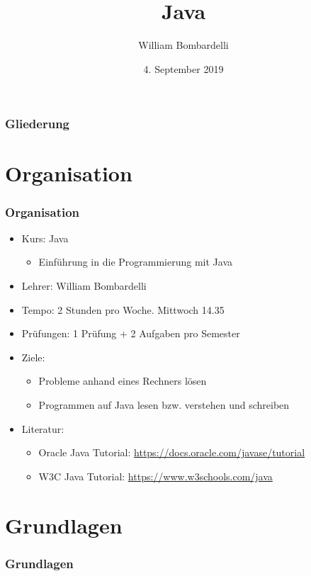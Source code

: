 \documentclass{beamer}
\title[Java]{Java}
\author[W. Bombardelli]{William Bombardelli}
\institute[Schweizerschule Mexiko]
{
	\vskip 12pt
	Schweizerschule Mexiko, Ciudad de México, Mexiko \\
	\texttt{E-Mail...}
}
\date{4. September 2019}
\begin{document}
	\begin{frame}
		\titlepage
	\end{frame}
	
	\begin{frame}
		\frametitle{Gliederung}
		\tableofcontents
	\end{frame}
	
	\section{Organisation}
	\begin{frame}
		\frametitle{Organisation}
		
		\begin{itemize}
			\item Kurs: Java
			\begin{itemize}
				\item Einführung in die Programmierung mit Java
			\end{itemize}
			\item Lehrer: William Bombardelli
			\item Tempo: 2 Stunden pro Woche. Mittwoch 14.35
			\item Prüfungen: 1 Prüfung + 2 Aufgaben pro Semester
			\item Ziele:
			\begin{itemize}
				\item Probleme anhand eines Rechners lösen
				\item Programmen auf Java lesen bzw. verstehen und schreiben 
			\end{itemize}
			\item Literatur: 
			\begin{itemize}
				\item Oracle Java Tutorial: \url{https://docs.oracle.com/javase/tutorial}
				\item W3C Java Tutorial: \url{https://www.w3schools.com/java}
			\end{itemize}
		\end{itemize}
	\end{frame}

	\section{Grundlagen}
	\begin{frame}
		\frametitle{Grundlagen}
	\end{frame}
\end{document}
